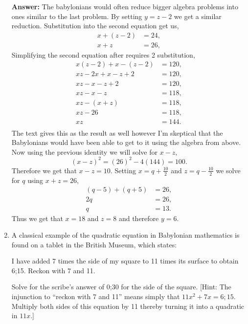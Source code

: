 \documentclass[12pt]{article}
\theoremstyle{homework}
\begin{document}
\begin{enumerate}
\textbf{Answer:} The babylonians would often reduce bigger algebra problems into ones similar to the last problem. By setting $y = z-2$ we get a 
similar reduction. Substitution into the second equation get us,
\begin{align*}
  x + (z - 2) &= 24,\\
  x + z &= 26,
\end{align*} 
Simplifying the second equation after requires 2 substitution,
\begin{align*}
  x(z-2)+x-(z - 2)&=120,\\
  xz-2x + x - z +2 &=120,\\
  xz - x - z + 2 &=120,\\
  xz - x - z &=118,\\
  xz - (x + z) &=118,\\
  xz - 26 &=118,\\
  xz &=144.\\
\end{align*}
The text gives this as the result as well however I'm skeptical that the Babylonians would have been able to get to it using the algebra from above. 
Now using the previous identity we will solve for $x-z$, 
\begin{equation*}
  (x-z)^2 = (26)^2 - 4(144) = 100.
\end{equation*}
Therefore we get that $x - z = 10$. Setting $x = q + \frac{10}{2}$ and $z = q - \frac{10}{2}$ we solve for $q$ using $x + z = 26$,
\begin{align*}
  (q - 5) + (q + 5) &= 26,\\
  2q &= 26,\\
  q &= 13.
\end{align*}
Thus we get that $x = 18$ and $z = 8$ and therefore $y = 6$.
\vspace{.5in}

\setcounter{enumi}{8}
\item A classical example of the quadratic equation in Babylonian mathematics is found on a tablet in the British Museum, which states:
\begin{center}
I have added 7 times the side of my square to 11 times its surface to obtain 6;15. Reckon with 7 and 11.
\end{center}
Solve for the scribe’s answer of 0;30 for the side of the square. [Hint:  The injunction to “reckon with 7 and 11” means simply that $11x^2+7x=6;15$. Multiply both sides of this equation by 11 thereby turning it into a quadratic in $11x$.]\\


\end{enumerate}
\end{document}
